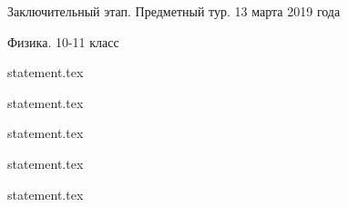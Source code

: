 \documentclass[a4paper,11pt, oneside]{book}
\begin{document}
\vspace{-3mm}
\vspace{-5mm}
\vspace{-5mm}

\normalsize

\begin{center}
    Заключительный этап. Предметный тур. 13 марта 2019 года
    
    Физика. 10-11 класс
\end{center}

\parindent=0cm

{statement.tex}

{statement.tex}

{statement.tex}

{statement.tex}

\newpage

{statement.tex}
\end{document}
